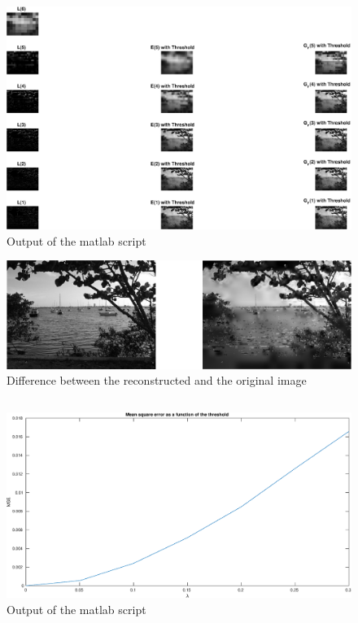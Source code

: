\documentclass[DIN, pagenumber=false, fontsize=11pt, parskip=half]{scrartcl}
\begin{document}
    \subsection{}
    
    \begin{figure}[H]
        \centering
        \includegraphics[width=\textwidth]{sh05ex02_3_1.eps}
        \caption{Output of the matlab script}
    \end{figure}
    \begin{figure}[H]
        \centering
        \includegraphics[width=\textwidth]{sh05ex02_3_2.eps}
        \caption{Difference between the reconstructed and the original image}
    \end{figure}

    \subsection{}
    
    \begin{figure}[H]
        \centering
        \includegraphics[width=\textwidth]{sh05ex02_4.eps}
        \caption{Output of the matlab script}
    \end{figure}
\end{document}
